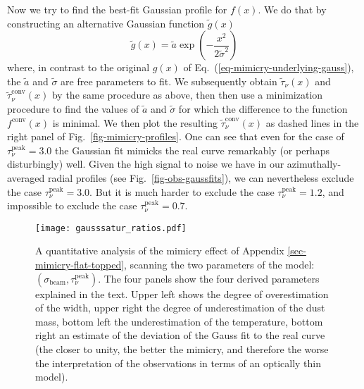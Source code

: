 \documentclass{aa}
\begin{document}
Now we try to find the best-fit Gaussian profile for $f(x)$. We do that by
constructing an alternative Gaussian function $\tilde g(x)$
\begin{equation}\label{eq-mimicry-mimicked-gauss}
\tilde g(x) = \tilde a\exp\left(-\frac{x^2}{2\tilde\sigma^2}\right)
\end{equation}
where, in contrast to the original $g(x)$ of
Eq.~(\ref{eq-mimicry-underlying-gauss}), the $\tilde a$ and $\tilde\sigma$ are
free parameters to fit. We subsequently obtain $\tilde \tau_\nu(x)$ and $\tilde
\tau_\nu^{\mathrm{conv}}(x)$ by the same procedure as above, then then use a
minimization procedure to find the values of $\tilde a$ and $\tilde \sigma$ for
which the difference to the function $f^{\mathrm{conv}}(x)$ is minimal.  We then
plot the resulting $\tilde \tau_\nu^{\mathrm{conv}}(x)$ as dashed lines in the
right panel of Fig.~\ref{fig-mimicry-profiles}. One can see that even for the
case of $\tau_\nu^{\mathrm{peak}}=3.0$ the Gaussian fit mimicks the real curve
remarkably (or perhaps disturbingly) well. Given the high signal to noise we
have in our azimuthally-averaged radial profiles (see
Fig.~\ref{fig-obs-gaussfits}), we can nevertheless exclude the case
$\tau_\nu^{\mathrm{peak}}=3.0$. But it is much harder to exclude the case
$\tau_\nu^{\mathrm{peak}}=1.2$, and impossible to exclude the case
$\tau_\nu^{\mathrm{peak}}=0.7$.

\begin{figure*}
\centerline{\texttt{[image: gausssatur\_ratios.pdf]}}
\caption{\label{fig-mimicry-bestfitgauss-ratios}A quantitative analysis of
  the mimicry effect of Appendix \ref{sec-mimicry-flat-topped}, scanning
  the two parameters of the model: $(\sigma_{\mathrm{beam}},\tau_\nu^{\mathrm{peak}})$.
  The four panels show the four derived parameters explained in the text.
  Upper left shows the degree of overestimation of the width, upper right
  the degree of underestimation of the dust mass, bottom left the underestimation
  of the temperature, bottom right an estimate of the deviation of the Gauss fit
  to the real curve (the closer to unity, the better the mimicry, and therefore
  the worse the interpretation of the observations in terms of an optically thin
  model).
}
\end{figure*}
\end{document}
